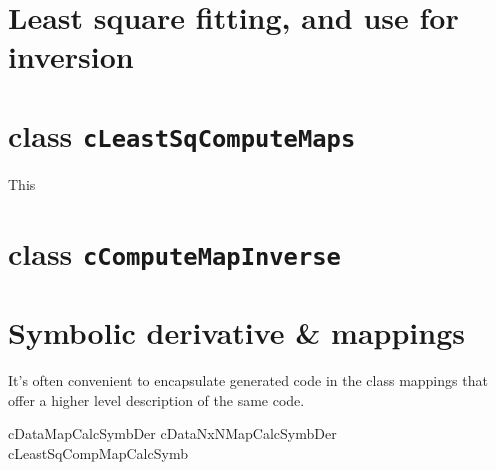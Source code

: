 \section{Least square fitting, and use for inversion}

\section{class {\tt cLeastSqComputeMaps}}

This 


\section{class {\tt cComputeMapInverse}}


\section{Symbolic derivative \& mappings}

It's often convenient to encapsulate generated code in the class
mappings that offer a higher level description of the same code. 

cDataMapCalcSymbDer
cDataNxNMapCalcSymbDer
cLeastSqCompMapCalcSymb




\label{CompMapInv}






